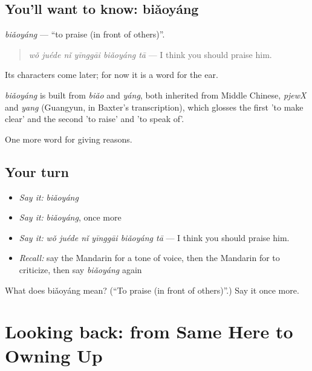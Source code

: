 \subsection*{You'll want to know: biǎoyáng}
\emph{biǎoyáng} — \textquotedblleft{}to praise (in front of others)\textquotedblright{}.

\begin{quote}
\emph{wǒ juéde nǐ yīnggāi biǎoyáng tā} — I think you should praise him.
\end{quote}

Its characters come later; for now it is a word for the ear.

\begin{cousinweb}
\emph{biǎoyáng} is built from \emph{biǎo} and \emph{yáng}, both inherited from Middle Chinese, \emph{pjewX} and \emph{yang} (Guangyun, in Baxter's transcription), which glosses the first 'to make clear' and the second 'to raise' and 'to speak of'.
\end{cousinweb}

\begin{grammarlens}[title={What you've built}]
One more word for giving reasons.
\end{grammarlens}

\subsection*{Your turn}
\begin{itemize}
\raggedright
  \item \emph{Say it:} \emph{biǎoyáng}
  \item \emph{Say it:} \emph{biǎoyáng}, once more
  \item \emph{Say it:} \emph{wǒ juéde nǐ yīnggāi biǎoyáng tā} — I think you should praise him.
  \item \emph{Recall:} say the Mandarin for a tone of voice, then the Mandarin for to criticize, then say \emph{biǎoyáng} again
\end{itemize}

\begin{tcolorbox}[breakable,colback=teal!4,colframe=teal!35!black,title={Before you move on}]
What does biǎoyáng mean? (\textquotedblleft{}To praise (in front of others)\textquotedblright{}.) Say it once more.
\end{tcolorbox}
\section[(dialogue)]{Looking back: from Same Here to Owning Up}

